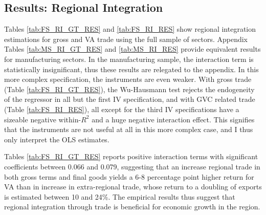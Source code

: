 \documentclass[a4paper]{article}
\begin{document}


\subsection{Results: Regional Integration}

Tables \ref{tab:FS_RI_GT_RES} and \ref{tab:FS_RI_RES} show regional integration estimations for gross and VA trade using the full sample of sectors. Appendix Tables \ref{tab:MS_RI_GT_RES} and \ref{tab:MS_RI_RES} provide equivalent results for manufacturing sectors. In the manufacturing sample, the interaction term is statistically insignificant, thus these results are relegated to the appendix. In this more complex specification, the instruments are even weaker. With gross trade (Table \ref{tab:FS_RI_GT_RES}), the Wu-Hausmann test rejects the endogeneity of the regressor in all  but the first IV specification, and with GVC related trade (Table \ref{tab:FS_RI_RES}), all except for the third IV specifications have a sizeable negative within-$R^2$ and a huge negative interaction effect. This signifies that the instruments are not useful at all in this more complex case, and I thus only interpret the OLS estimates. \newpage 

Tables \ref{tab:FS_RI_GT_RES} reports positive interaction terms with significant coefficients between 0.066 and 0.079, suggesting that an increase regional trade in both gross terms and final goods yields a 6-8 percentage point higher return for VA than in increase in extra-regional trade, whose return to a doubling of exports is estimated between 10 and 24\%. The empirical results thus suggest that regional integration through trade is beneficial for economic growth in the region.  
\end{document}
